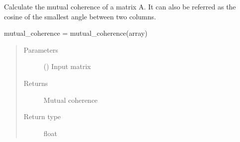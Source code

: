 \documentclass[letterpaper,10pt,english,openany,oneside]{sphinxmanual}
\begin{document}

\begin{fulllineitems}
\label{\detokenize{pygpc:pygpc.misc.mutual_coherence}}
Calculate the mutual coherence of a matrix A. It can also be referred as the cosine of the smallest angle
between two columns.

mutual\_coherence = mutual\_coherence(array)
\begin{quote}\begin{description}
\item[{Parameters}] \leavevmode
{} () \textendash{} Input matrix

\item[{Returns}] \leavevmode
{} \textendash{} Mutual coherence

\item[{Return type}] \leavevmode
float

\end{description}\end{quote}

\end{fulllineitems}

\end{document}
